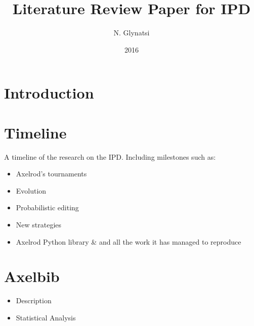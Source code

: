 \documentclass{article}
\title{Literature Review Paper for IPD}
\author{N. Glynatsi}
\date{2016}
\begin{document}
\maketitle

\section{Introduction}

\section{Timeline}
A timeline of the research on the IPD. Including milestones such as:
\begin{itemize}
    \item Axelrod's tournaments
    \item Evolution
    \item Probabilistic editing
    \item New strategies
    \item Axelrod Python library \& and all the work it has managed to reproduce
\end{itemize}

\section{Axelbib}
    \begin{itemize}
        \item Description
        \item Statistical Analysis
    \end{itemize}
\end{document}
